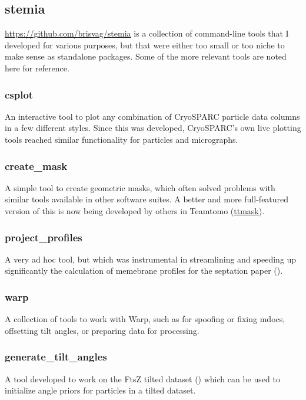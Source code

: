 \subsection{stemia}

\href{Stemia}{https://github.com/brisvag/stemia} is a collection of command-line tools that I developed for various purposes, but that were either too small or too niche to make sense as standalone packages.
Some of the more relevant tools are noted here for reference.


\subsubsection{csplot}
An interactive tool to plot any combination of CryoSPARC particle data columns in a few different styles.
Since this was developed, CryoSPARC's own live plotting tools reached similar functionality for particles and micrographs.

\subsubsection{create_mask}
A simple tool to create geometric masks, which often solved problems with similar tools available in other software suites.
A better and more full-featured version of this is now being developed by others in Teamtomo (\href{https://github.com/teamtomo/ttmask}{ttmask}).

\subsubsection{project_profiles}
A very ad hoc tool, but which was instrumental in streamlining and speeding up significantly the calculation of memebrane profiles for the septation paper ().

\subsubsection{warp}
A collection of tools to work with Warp, such as for spoofing or fixing mdocs, offsetting tilt angles, or preparing data for processing.

\subsubsection{generate_tilt_angles}\label{stemia_angles}
A tool developed to work on the FtsZ tilted dataset () which can be used to initialize angle priors for particles in a tilted dataset.
